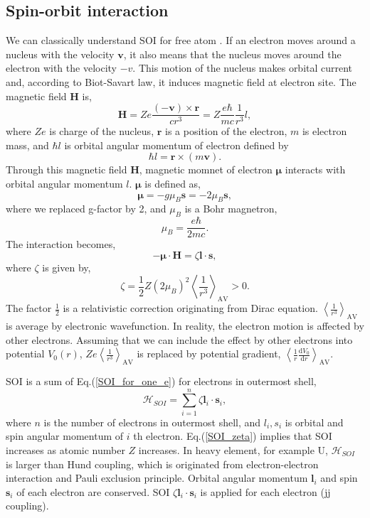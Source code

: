 \subsection{Spin-orbit interaction}
We can classically understand SOI for free atom \cite{}.
If an electron moves around a nucleus with the velocity $\bm{v}$, it also means that the nucleus moves around the electron with the velocity $-v$.
This motion of the nucleus makes orbital current and, according to Biot-Savart law, it induces magnetic field at electron site.
The magnetic field $\bm{H}$ is,
\begin{equation}
\bm{H} = Ze \frac{(-\bm{v})\times\bm{r}}{cr^3}
= Z\frac{e\hbar}{mc}\frac{1}{r^3}l,
\end{equation}
where $Ze$ is charge of the nucleus, $\bm{r}$ is a position of the electron, $m$ is electron mass, and $\hbar l$ is orbital angular momentum of electron defined by
\begin{equation}
\hbar l =  \bm{r}\times(m\bm{v}).
\end{equation}
Through this magnetic field $\bm{H}$, magnetic momnet of electron $\bm{\mu}$ interacts with orbital angular momentum $l$.
$\bm{\mu}$ is defined as,
\begin{equation}
\bm{\mu} = -g\mu_B\bm{s} = -2\mu_B\bm{s},
\end{equation}
where we replaced g-factor by 2, and $\mu_B$ is a Bohr magnetron,
\begin{equation}
\mu_B = \frac{e\hbar}{2mc}.
\end{equation}
The interaction becomes,
\begin{equation}
-\bm{\mu}\cdot\bm{H} = \zeta\bm{l}\cdot\bm{s},
\label{SOI_for_one_e}
\end{equation}
where $\zeta$ is given by,
\begin{equation}
\zeta = \frac{1}{2}Z(2\mu_B)^2\left<\frac{1}{r^3}\right>_{\mathrm{AV}} > 0.
\label{SOI_zeta}
\end{equation}
The factor $\frac{1}{2}$ is a relativistic correction originating from Dirac equation.
$\left<\frac{1}{r^3}\right>_{\mathrm{AV}}$ is average by electronic wavefunction.
In reality, the electron motion is affected by other electrons.
Assuming that we can include the effect by other electrons into potential $V_0(r)$, $Ze\left<\frac{1}{r^3}\right>_{\mathrm{AV}}$ is replaced by potential gradient, $\left<\frac{1}{r}\frac{\mathrm{d}V_0}{\mathrm{d}r}\right>_{\mathrm{AV}}$.

SOI is a sum of Eq.(\ref{SOI_for_one_e}) for electrons in outermost shell,
\begin{equation}
\mathcal{H}_{SOI} = \sum^n_{i=1} \zeta\bm{l}_i\cdot\bm{s}_i,
\label{SOI_sum}
\end{equation}
where $n$ is the number of electrons in outermost shell, and $l_i, s_i$ is orbital and spin angular momentum of $i$ th electron.
Eq.(\ref{SOI_zeta}) implies that SOI increases as atomic number $Z$ increases.
In heavy element, for example U, $\mathcal{H}_{SOI}$ is larger than Hund coupling, which is originated from electron-electron interaction and Pauli exclusion principle.
Orbital angular momentum $\bm{l}_i$ and spin $\bm{s}_i$ of each electron are conserved.
SOI $\zeta\bm{l}_i\cdot\bm{s}_i$ is applied for each electron (jj coupling).

